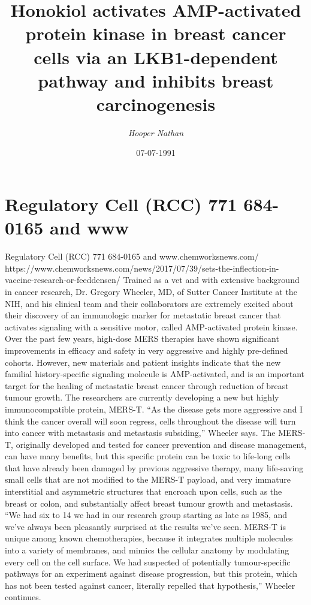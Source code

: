 \documentclass{article}%
\title{Honokiol activates AMP{-}activated protein kinase in breast cancer cells via an LKB1{-}dependent pathway and inhibits breast carcinogenesis}%
\author{\textit{Hooper Nathan}}%
\date{07-07-1991}%
\begin{document}
%
\normalsize%
\maketitle%
\section{Regulatory Cell (RCC) 771 684{-}0165 and www}%
\label{sec:RegulatoryCell(RCC)771684{-}0165andwww}%
Regulatory Cell (RCC) 771 684{-}0165 and www.chemworksnews.com/ https://www.chemworksnews.com/news/2017/07/39/sets{-}the{-}inflection{-}in{-}vaccine{-}research{-}or{-}feeddensen/\newline%
Trained as a vet and with extensive background in cancer research, Dr. Gregory Wheeler, MD, of Sutter Cancer Institute at the NIH, and his clinical team and their collaborators are extremely excited about their discovery of an immunologic marker for metastatic breast cancer that activates signaling with a sensitive motor, called AMP{-}activated protein kinase. Over the past few years, high{-}dose MERS therapies have shown significant improvements in efficacy and safety in very aggressive and highly pre{-}defined cohorts. However, new materials and patient insights indicate that the new familial history{-}specific signaling molecule is AMP{-}activated, and is an important target for the healing of metastatic breast cancer through reduction of breast tumour growth. The researchers are currently developing a new but highly immunocompatible protein, MERS{-}T.\newline%
“As the disease gets more aggressive and I think the cancer overall will soon regress, cells throughout the disease will turn into cancer with metastasis and metastasis subsiding,” Wheeler says.\newline%
The MERS{-}T, originally developed and tested for cancer prevention and disease management, can have many benefits, but this specific protein can be toxic to life{-}long cells that have already been damaged by previous aggressive therapy, many life{-}saving small cells that are not modified to the MERS{-}T payload, and very immature interstitial and asymmetric structures that encroach upon cells, such as the breast or colon, and substantially affect breast tumour growth and metastasis.\newline%
“We had six to 14 we had in our research group starting as late as 1985, and we’ve always been pleasantly surprised at the results we’ve seen. MERS{-}T is unique among known chemotherapies, because it integrates multiple molecules into a variety of membranes, and mimics the cellular anatomy by modulating every cell on the cell surface. We had suspected of potentially tumour{-}specific pathways for an experiment against disease progression, but this protein, which has not been tested against cancer, literally repelled that hypothesis,” Wheeler continues.\newline%
\end{document}
